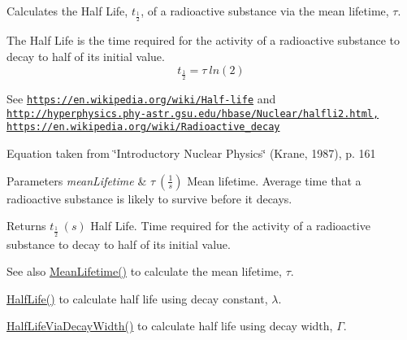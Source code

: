 Calculates the Half Life, $t_{\frac{1}{2}}$, of a radioactive substance via the mean lifetime, $\tau$. 

The Half Life is the time required for the activity of a radioactive substance to decay to half of its initial value. \[t_{\frac{1}{2}}= \tau \ ln(2)\]

See \href{https://en.wikipedia.org/wiki/Half-life}{\tt https\+://en.\+wikipedia.\+org/wiki/\+Half-\/life} and \href{http://hyperphysics.phy-astr.gsu.edu/hbase/Nuclear/halfli2.html,}{\tt http\+://hyperphysics.\+phy-\/astr.\+gsu.\+edu/hbase/\+Nuclear/halfli2.\+html,} \href{https://en.wikipedia.org/wiki/Radioactive_decay}{\tt https\+://en.\+wikipedia.\+org/wiki/\+Radioactive\+\_\+decay}

Equation taken from \char`\"{}\+Introductory Nuclear Physics\char`\"{} (Krane, 1987), p. 161


\begin{DoxyParams}{Parameters}
{\em mean\+Lifetime} & $\tau\ (\frac{1}{s})$ Mean lifetime. Average time that a radioactive substance is likely to survive before it decays. \\
\hline
\end{DoxyParams}
\begin{DoxyReturn}{Returns}
$t_{\frac{1}{2}}\ (s)$ Half Life. Time required for the activity of a radioactive substance to decay to half of its initial value. 
\end{DoxyReturn}
\begin{DoxySeeAlso}{See also}
\mbox{\hyperlink{group___e_g_x_phys-_mean_lifetime_gaa9e3c2deedda4bc7a745568b06fc47eb}{Mean\+Lifetime()}} to calculate the mean lifetime, $\tau$. 

\mbox{\hyperlink{group___e_g_x_phys-_half_life_ga21d268f154fb91c1c556bbfa7fe83ac1}{Half\+Life()}} to calculate half life using decay constant, $\lambda$. 

\mbox{\hyperlink{group___e_g_x_phys-_half_life_gaba3fda944d1a68ee1016a1f2f5809359}{Half\+Life\+Via\+Decay\+Width()}} to calculate half life using decay width, $\Gamma$. 
\end{DoxySeeAlso}
